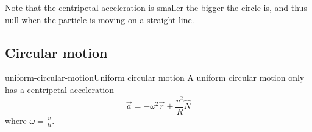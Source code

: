 \documentclass[preview]{standalone}
\begin{document}
\begin{plainhtml}
    Note that the centripetal acceleration is smaller the bigger the circle is, and thus null when the particle is
    moving on a straight line.
\end{plainhtml}

\subsection{Circular motion}

\begin{snippetproposition}{uniform-circular-motion}{Uniform circular motion}
    A uniform circular motion only has a centripetal acceleration
    \[
        \vec{a} = -\omega^2\vec{r} + \frac{v^2}{R} \hat{N}
    \]
    where \(\omega = \frac{v}{R}\).
\end{snippetproposition}
\end{document}
